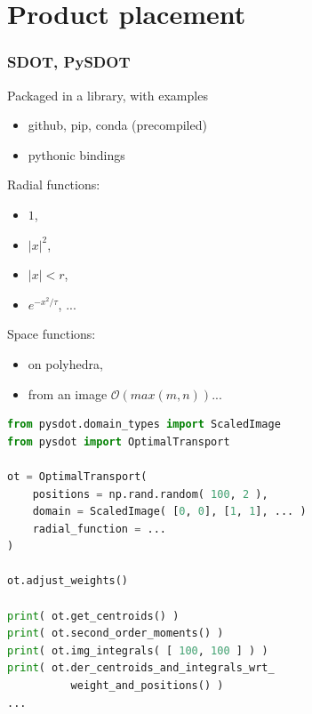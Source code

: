 \documentclass[aspectratio=169]{beamer}
\begin{document}
\section{Product placement}

\begin{frame}[fragile]
    \frametitle{SDOT, PySDOT}

    \begin{minipage}[c][0.8\textheight][c]{0.44\textwidth}
        Packaged in a library, with examples
        \begin{itemize}
            \item github, pip, conda (precompiled)
            \item pythonic bindings
        \end{itemize}
    
        \vfill
        Radial functions:
        \begin{itemize}
            \item $1$,
            \item $|x|^2$,
            \item $|x| < r$,
            \item $e^{-x^2 / \tau}$, ...
        \end{itemize}
    
        \vfill
        Space functions:
        \begin{itemize}
            \item on polyhedra,
            \item from an image $\mathcal{O}( max( m, n ) )$...
        \end{itemize}
        \end{minipage}
    \begin{minipage}[c][0.8\textheight][c]{0.55\textwidth}
        \begin{scriptsize}
            \begin{lstlisting}[language=Python]
from pysdot.domain_types import ScaledImage
from pysdot import OptimalTransport

ot = OptimalTransport(
    positions = np.rand.random( 100, 2 ),
    domain = ScaledImage( [0, 0], [1, 1], ... )
    radial_function = ...
)

ot.adjust_weights()

print( ot.get_centroids() )
print( ot.second_order_moments() )
print( ot.img_integrals( [ 100, 100 ] ) )
print( ot.der_centroids_and_integrals_wrt_
          weight_and_positions() )
...
            \end{lstlisting}
        \end{scriptsize}
    \end{minipage}
\end{frame}
\end{document}
